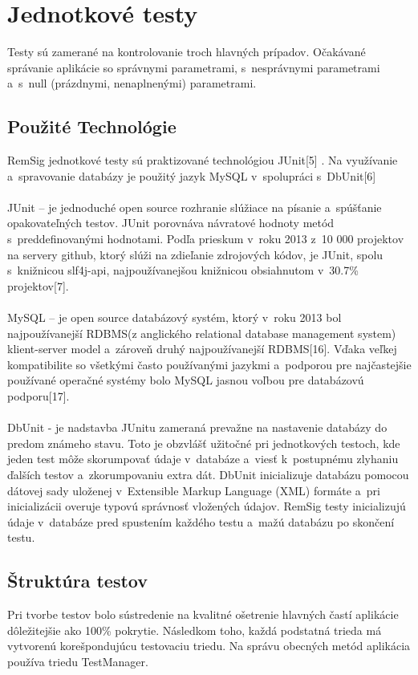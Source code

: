 \documentclass[
  digital, %
  table,   %
oneside,
  nolof,     %
  nolot,     %
]{fithesis3}
\begin{document}
\section{Jednotkové testy}
Testy sú zamerané na kontrolovanie troch hlavných prípadov. Očakávané správanie aplikácie so správnymi parametrami, s~nesprávnymi parametrami a~s~null (prázdnymi, nenaplnenými) parametrami.
\subsection{Použité Technológie}
RemSig jednotkové testy sú praktizované technológiou  JUnit[5] . Na využívanie a~spravovanie databázy je použitý jazyk MySQL v~spolupráci s~DbUnit[6]\paragraph{}
JUnit – je jednoduché open source rozhranie slúžiace na písanie a~spúšťanie opakovateľných testov. JUnit porovnáva návratové hodnoty metód s~preddefinovanými hodnotami. Podľa prieskum v~roku 2013 z~10 000 projektov na servery github, ktorý slúži na zdieľanie zdrojových kódov, je JUnit, spolu s~knižnicou slf4j-api, najpoužívanejšou knižnicou obsiahnutom v~30.7\% projektov[7]. \paragraph{}
MySQL – je open source databázový systém, ktorý  v~roku 2013 bol najpoužívanejší RDBMS(z anglického relational database management system) klient-server model a~zároveň druhý najpoužívanejší RDBMS[16]. Vďaka veľkej kompatibilite so všetkými často používanými jazykmi a~podporou pre najčastejšie používané operačné systémy bolo MySQL jasnou voľbou pre databázovú podporu[17].\paragraph{}
DbUnit -  je nadstavba JUnitu zameraná prevažne na nastavenie databázy do predom známeho stavu. Toto je obzvlášť užitočné pri jednotkových testoch, kde jeden test môže skorumpovať údaje v~databáze a~viesť k~postupnému zlyhaniu ďalších  testov a~zkorumpovaniu extra dát. DbUnit inicializuje databázu pomocou  dátovej sady uloženej v~Extensible Markup Language (XML) formáte a~pri inicializácii overuje typovú správnosť vložených údajov. RemSig testy inicializujú údaje v~databáze pred  spustením  každého testu a~mažú databázu po skončení testu.  

\subsection{Štruktúra testov}
Pri tvorbe testov bolo sústredenie na kvalitné ošetrenie hlavných častí aplikácie dôležitejšie ako 100\% pokrytie. Následkom toho, každá podstatná trieda má vytvorenú korešpondujúcu testovaciu triedu. Na správu obecných metód aplikácia používa triedu TestManager. 
\end{document}
